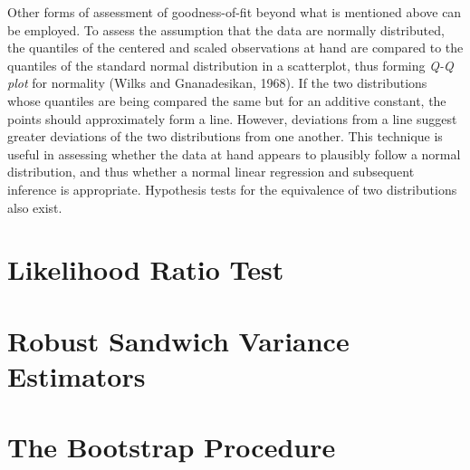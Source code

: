 		Other forms of assessment of goodness-of-fit beyond what is mentioned above can be employed. To assess the assumption that the data are normally distributed, the quantiles of the centered
		and scaled observations at hand are compared to the quantiles of the standard normal distribution in a scatterplot, thus forming \textit{Q-Q plot} for normality (Wilks and Gnanadesikan, 1968).
		If the two distributions whose quantiles are being compared the same but for an additive constant, the points should approximately form a line. However, deviations from a line suggest
		greater deviations of the two distributions from one another. This technique is useful in assessing whether the data at hand appears to plausibly follow a normal distribution, and thus
		whether a normal linear regression and subsequent inference is appropriate. Hypothesis tests for the equivalence of two distributions also exist.


		\section{Likelihood Ratio Test}

		\section{Robust Sandwich Variance Estimators}

		\section{The Bootstrap Procedure}
		